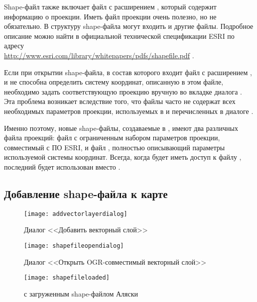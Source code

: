 Shape-файл также включает файл с расширением , который
содержит информацию о проекции. Иметь файл проекции очень полезно, но не
обязательно. В структуру shape-файла могут входить и другие файлы. Подробное
описание можно найти в официальной технической спецификации ESRI по адресу \\
\url{http://www.esri.com/library/whitepapers/pdfs/shapefile.pdf} .


Если при открытии shape-файла, в состав которого входит файл с расширением
, и \qg не способна определить систему координат, описанную
в этом файле, необходимо задать соответствующую проекцию вручную во вкладке
 диалога . Эта проблема возникает вследствие
того, что файлы  часто не содержат всех необходимых параметров
проекции, используемых в \qg и перечисленных в диалоге
.

Именно поэтому, новые shape-файлы, создаваемые в \qg, имеют два различных
файла проекций: файл  с ограниченным набором параметров
проекции, совместимый с ПО ESRI, и файл , полностью описывающий
параметры используемой системы координат. Всегда, когда \qg будет иметь доступ
к файлу , последний будет использован вместо .

\subsection{Добавление shape-файла к карте}\label{sec:load_shapefile}

\begin{figure}[ht]
   \centering
   \texttt{[image: addvectorlayerdialog]}
   \caption{Диалог <<Добавить векторный слой>> \nixcaption}\label{fig:addvectorlayer}
\end{figure}

\begin{figure}[ht]
   \centering
   \texttt{[image: shapefileopendialog]}
   \caption{Диалог <<Открыть OGR-совместимый векторный слой>> \nixcaption}\label{fig:openshapefile}
\end{figure}

\begin{figure}[ht]
   \centering
   \texttt{[image: shapefileloaded]}
   \caption{\qg с загруженным shape-файлом Аляски \nixcaption}\label{fig:loadedshapefile}
\end{figure}


